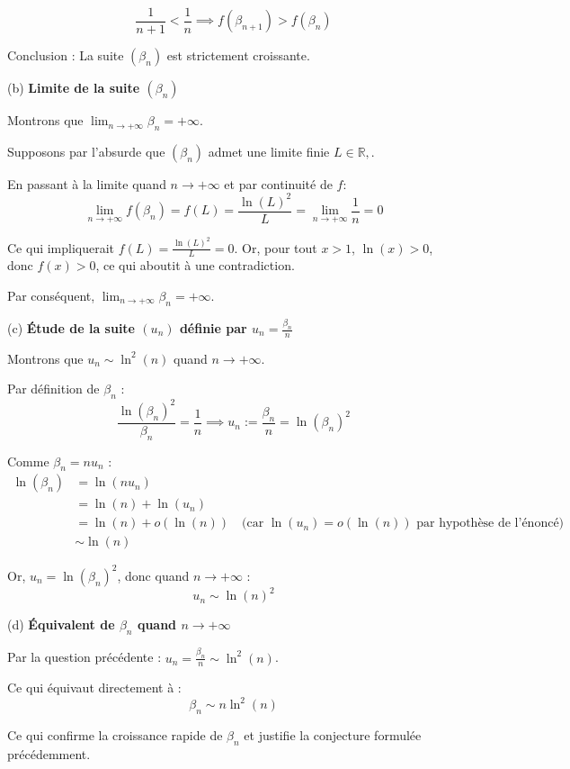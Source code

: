 \documentclass[10pt,a4paper]{article}
\begin{document}
\[
\frac{1}{n+1} < \frac{1}{n} \implies f(\beta_{n+1}) > f(\beta_n)
\]

Conclusion : La suite \((\beta_n)\) est strictement croissante.

\bigskip
(b) \textbf{Limite de la suite \((\beta_n)\)}

Montrons que \(\lim_{n \to +\infty} \beta_n = +\infty\).

Supposons par l'absurde que \((\beta_n)\) admet une limite finie \(L \in \mathbb{R}, \).

En passant à la limite quand \(n \to +\infty\) et par continuité de \(f\):
\[
\lim_{n \to +\infty} f(\beta_n) = f(L) = \frac{\ln(L)^2}{L} = \lim_{n \to +\infty} \frac{1}{n} = 0
\]

Ce qui impliquerait \(f(L) = \frac{\ln(L)^2}{L} = 0\). Or, pour tout \(x > 1\), \(\ln(x) > 0\), donc
\(f(x) > 0\), ce qui aboutit à une contradiction.

Par conséquent, \(\lim_{n \to +\infty} \beta_n = +\infty\).

\bigskip
(c) \textbf{Étude de la suite \((u_n)\) définie par \(u_n = \frac{\beta_n}{n}\)}

Montrons que \(u_n \sim \ln^2(n)\) quand \(n \to +\infty\).

Par définition de \(\beta_n\) :
\[
\frac{\ln(\beta_n)^2}{\beta_n} = \frac{1}{n} \implies
u_n := \frac{\beta_n}{n} = \ln(\beta_n)^2
\]

Comme \(\beta_n = n u_n\) :
\begin{align*}
\ln(\beta_n) &= \ln(n u_n)\\
&= \ln(n) + \ln(u_n) \\
&= \ln(n) + o(\ln(n)) \quad \text{(car \(\ln(u_n) = o(\ln(n))\) par hypothèse de l'énoncé)}\\
&\sim \ln(n)
\end{align*}

Or, \(u_n = \ln(\beta_n)^2\), donc quand \(n \to +\infty\) :
\[
u_n \sim \ln(n)^2
\]

\bigskip
(d) \textbf{Équivalent de \(\beta_n\) quand \(n \to +\infty\)}

Par la question précédente : \(u_n = \frac{\beta_n}{n} \sim \ln^2(n)\).

Ce qui équivaut directement à :
\[
\beta_n \sim n \ln^2(n)
\]

Ce qui confirme la croissance rapide de \(\beta_n\) et justifie la conjecture formulée précédemment.
\end{document}
